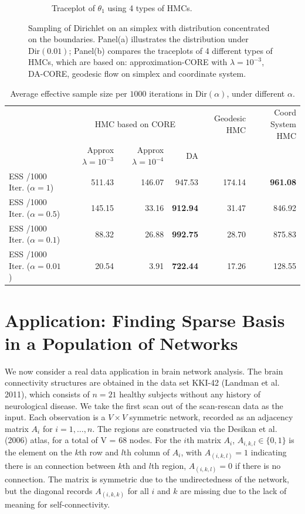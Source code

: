 \documentclass[10pt,fleqn]{article}
\DeclareMathOperator{\1}{\mathbbm{1}}
\begin{document}
\begin{figure}[H]
\begin{subfigure}[b]{0.45\textwidth}
\caption{Traceplot of $\theta_1$ using 4 types of HMCs.}
\end{subfigure}
\caption{Sampling of Dirichlet on an simplex with distribution concentrated on the boundaries.
Panel(a) illustrates the distribution under $\text{Dir}(0.01)$; Panel(b)
compares the traceplots of 4 different types of HMCs, which are based on: approximation-CORE with $\lambda=10^{-3}$, DA-CORE, geodesic flow on simplex \citep{byrne2013geodesic} and coordinate
system.}
\label{simplex}
\end{figure}


   \begin{table}[H]
     
   \begin{center}
   \tiny
   \begin{tabular}{ l| r | r| r |r | r}
   \hline     
    & \multicolumn{3}{c|}{HMC based on CORE}     & Geodesic HMC  & Coord
    System HMC \\   
        & {Approx $\lambda=10^{-3}$} & {Approx $\lambda=10^{-4}$}      & DA
        &  \\  \hline         
   ESS /1000 Iter. ($\alpha=1$) & 511.43   & 146.07  & 947.53 &  174.14
   & \bf 961.08     \\
      ESS /1000 Iter. ($\alpha=0.5$) & 145.15  & 33.16  &\bf  912.94  & 31.47  & 846.92   \\
            ESS /1000 Iter. ($\alpha=0.1$) &  88.32   & 26.88& \bf 992.75  &28.70  & 875.83    \\
   ESS /1000 Iter. ($\alpha=0.01$) & 20.54 & 3.91 & {\bf 722.44} & 17.26  & 128.55  \\
   \hline  
   \end{tabular}
   \end{center}
   \caption{Average effective sample size per $1000$ iterations in $\text{Dir}(\alpha)$,
   under different $\alpha$. \label{simplex_tb}
}
   \end{table}

   \section{Application: Finding Sparse Basis in a Population of Networks}

 We now consider a real data application in brain network analysis. 
 The brain connectivity structures are obtained in the data set KKI-42 (Landman et al. 2011), which consists of $n=21$ healthy subjects without any history of neurological disease. We take the first scan out of the scan-rescan data
as the input. Each observation is a $V\times V$ symmetric network, recorded as an adjacency matrix $A_i$ for $i=1,\ldots,n$. The regions are constructed via the Desikan et al. (2006) atlas, for a total of V = 68 nodes.
For the $i$th matrix $A_i$, $A_{i,k,l} \in \{0,1\}$ is the element on the $k$th row and $l$th column of $A_i$, with $A_{(i,k,l)}=1$ indicating there is an connection between $k$th and $l$th region, $A_{(i,k,l)}=0$ if there is no connection. The matrix is symmetric due to the undirectedness of the network,
but the diagonal records $A_{(i,k,k)}$ for all $i$ and $k$ are missing due
to the lack of meaning for self-connectivity. 
\end{document}
